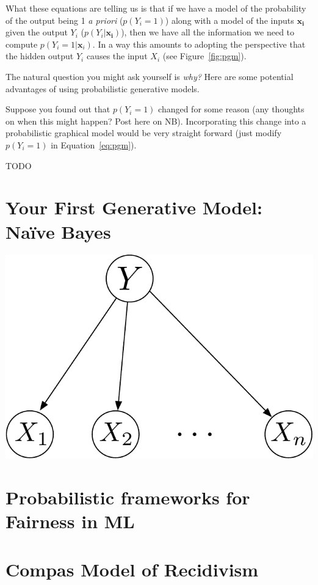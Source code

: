 \documentclass[assignment02_Solutions]{subfiles}
\begin{document}
What these equations are telling us is that if we have a model of the probability of the output being 1 \emph{a priori} ($p(Y_i = 1)$) along with a model of the inputs $\mathbf{x_i}$ given the output $Y_i$ ($p(Y_i | \mathbf{x_i})$), then we have all the information we need to compute $p(Y_i = 1 | \mathbf{x}_i)$.  In a way this amounts to adopting the perspective that the hidden output $Y_i$ causes the input $X_i$ (see Figure~\ref{fig:pgm}).

The natural question you might ask yourself is \emph{why?} Here are some potential advantages of using probabilistic generative models.
\bi
\item Suppose you found out that $p(Y_i = 1)$ changed for some reason (any thoughts on when this might happen?  Post here on NB).  Incorporating this change into a probabilistic graphical model would be very straight forward (just modify $p(Y_i =1)$ in Equation~\ref{eq:pgm}).
\ei

\begin{understandingcheck}
TODO
\end{understandingcheck}


\section{Your First Generative Model: Na\"ive Bayes}
\begin{marginfigure}
\includegraphics[width=\linewidth]{figures/naivebayesgm}
\end{marginfigure}



\section{Probabilistic frameworks for Fairness in ML}

\section{Compas Model of Recidivism}
\end{document}
